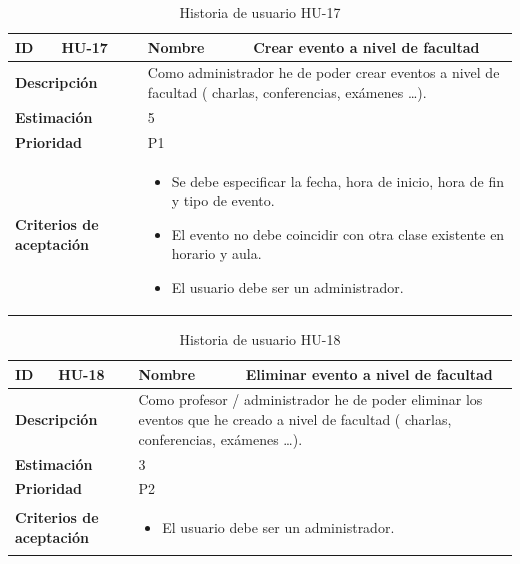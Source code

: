 \begin{table}[H]
    \centering
    \begin{tabular}{|p{2cm}|p{4cm}|p{2cm}|p{4cm}|}
        \hline
        \textbf{ID} & HU-17 & \textbf{Nombre} & Crear evento a nivel de facultad \\
        \hline
        \multicolumn{2}{|p{6cm}|}{\textbf{Descripción}} & \multicolumn{2}{p{6cm}|}{Como administrador he de poder crear eventos a nivel de facultad ( charlas, conferencias, exámenes …).} \\
        \hline
        \multicolumn{2}{|p{6cm}|}{\textbf{Estimación}} & \multicolumn{2}{p{6cm}|}{5} \\
        \hline
        \multicolumn{2}{|p{6cm}|}{\textbf{Prioridad}} & \multicolumn{2}{p{6cm}|}{P1} \\
        \hline
        \multicolumn{2}{|p{6cm}|}{\textbf{Criterios de aceptación}} & \multicolumn{2}{p{6cm}|}{
            \begin{itemize}
                \item Se debe especificar la fecha, hora de inicio, hora de fin y tipo de evento.
                \item El evento no debe coincidir con otra clase existente en horario y aula.
                \item El usuario debe ser un administrador.
            \end{itemize}
        } \\
        \hline
    \end{tabular}
    \caption{Historia de usuario HU-17}
    \label{tab:hu_17}
\end{table}

\begin{table}[H]
    \centering
    \begin{tabular}{|p{2cm}|p{4cm}|p{2cm}|p{4cm}|}
        \hline
        \textbf{ID} & HU-18 & \textbf{Nombre} & Eliminar evento a nivel de facultad \\
        \hline
        \multicolumn{2}{|p{6cm}|}{\textbf{Descripción}} & \multicolumn{2}{p{6cm}|}{Como profesor / administrador he de poder eliminar los eventos que he creado a nivel de facultad ( charlas, conferencias, exámenes …).} \\
        \hline
        \multicolumn{2}{|p{6cm}|}{\textbf{Estimación}} & \multicolumn{2}{p{6cm}|}{3} \\
        \hline
        \multicolumn{2}{|p{6cm}|}{\textbf{Prioridad}} & \multicolumn{2}{p{6cm}|}{P2} \\
        \hline
        \multicolumn{2}{|p{6cm}|}{\textbf{Criterios de aceptación}} & \multicolumn{2}{p{6cm}|}{
            \begin{itemize}
                \item El usuario debe ser un administrador.
            \end{itemize}
        } \\
        \hline
    \end{tabular}
    \caption{Historia de usuario HU-18}
    \label{tab:hu_18}
\end{table}

